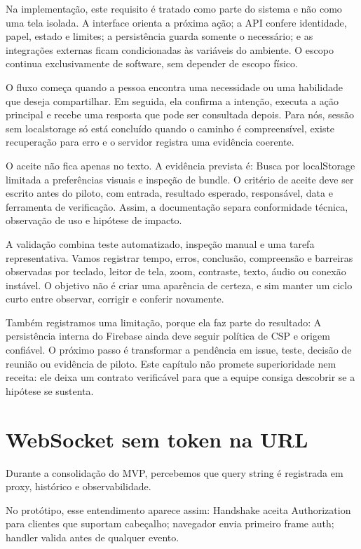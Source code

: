 \documentclass[12pt,oneside,a4paper,article]{abntex2}
\begin{document}
Na implementação, este requisito é tratado como parte do sistema e não como uma tela isolada. A interface orienta a próxima ação; a API confere identidade, papel, estado e limites; a persistência guarda somente o necessário; e as integrações externas ficam condicionadas às variáveis do ambiente. O escopo continua exclusivamente de software, sem depender de escopo físico.

O fluxo começa quando a pessoa encontra uma necessidade ou uma habilidade que deseja compartilhar. Em seguida, ela confirma a intenção, executa a ação principal e recebe uma resposta que pode ser consultada depois. Para nós, sessão sem localstorage só está concluído quando o caminho é compreensível, existe recuperação para erro e o servidor registra uma evidência coerente.

O aceite não fica apenas no texto. A evidência prevista é: Busca por localStorage limitada a preferências visuais e inspeção de bundle. O critério de aceite deve ser escrito antes do piloto, com entrada, resultado esperado, responsável, data e ferramenta de verificação. Assim, a documentação separa conformidade técnica, observação de uso e hipótese de impacto.

A validação combina teste automatizado, inspeção manual e uma tarefa representativa. Vamos registrar tempo, erros, conclusão, compreensão e barreiras observadas por teclado, leitor de tela, zoom, contraste, texto, áudio ou conexão instável. O objetivo não é criar uma aparência de certeza, e sim manter um ciclo curto entre observar, corrigir e conferir novamente.

Também registramos uma limitação, porque ela faz parte do resultado: A persistência interna do Firebase ainda deve seguir política de CSP e origem confiável. O próximo passo é transformar a pendência em issue, teste, decisão de reunião ou evidência de piloto. Este capítulo não promete superioridade nem receita: ele deixa um contrato verificável para que a equipe consiga descobrir se a hipótese se sustenta.

\section{WebSocket sem token na URL}
Durante a consolidação do MVP, percebemos que query string é registrada em proxy, histórico e observabilidade.

No protótipo, esse entendimento aparece assim: Handshake aceita Authorization para clientes que suportam cabeçalho; navegador envia primeiro frame auth; handler valida antes de qualquer evento.
\end{document}
